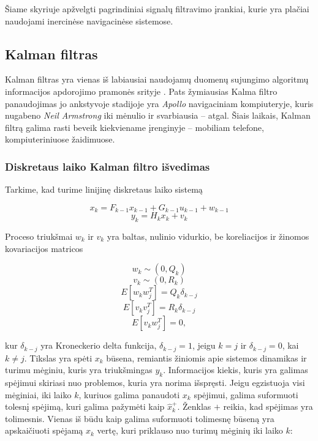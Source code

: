 Šiame skyriuje apžvelgti pagrindiniai signalų filtravimo įrankiai, kurie yra plačiai naudojami inercinėse navigacinėse sistemose.

\subsection{Kalman filtras}

    Kalman filtras \cite{kalman1960new} yra vienas iš labiausiai naudojamų duomenų sujungimo algoritmų informacijos apdorojimo pramonės srityje \cite{faragher2012understanding}. Pats žymiausias Kalma filtro panaudojimas jo ankstyvoje stadijoje yra \textit{Apollo} navigaciniam kompiuteryje, kuris nugabeno \textit{Neil Armstrong} iki mėnulio ir svarbiausia -- atgal. Šiais laikais, Kalman filtrą galima rasti beveik kiekviename įrenginyje -- mobiliam telefone, kompiuteriniuose žaidimuose.

    \subsubsection{Diskretaus laiko Kalman filtro išvedimas}

    Tarkime, kad turime linijinę diskretaus laiko sistemą

    \begin{equation}
        x_k = F_{k-1}x_{k-1} + G_{k-1}u_{k-1} + w_{k-1}
    \end{equation}
    \begin{equation}
        y_k = H_k x_k + v_k
    \end{equation}

    Proceso triukšmai ${w_k}$ ir ${v_k}$ yra baltas, nulinio vidurkio, be koreliacijos ir žinomos kovariacijos matricos

    \begin{equation}
    w_k \sim (0, Q_k)
    \end{equation}
    \begin{equation}
    v_k \sim (0, R_k)
    \end{equation}
    \begin{equation}
    E[w_k w_j^T] = Q_k \delta_{k-j}
    \end{equation}
    \begin{equation}
    E[v_k v_j^T] = R_k\delta_{k-j}
    \end{equation}
    \begin{equation}
    E[v_k w_j^T] = 0,
    \end{equation}

    kur $\delta_{k-j}$ yra Kroneckerio delta funkcija, $\delta_{k-j} = 1$, jeigu $k=j$ ir $\delta_{k-j} = 0$, kai $k \neq j$.
    Tikslas yra spėti $x_k$ būsena, remiantis žiniomis apie sistemos dinamikas ir turimu mėginiu, kuris yra triukšmingas ${y_k}$.
    Informacijos kiekis, kuris yra galimas spėjimui skiriasi nuo problemos, kuria yra norima išspręsti.
    Jeigu egzistuoja visi mėginiai, iki laiko $k$, kuriuos galima panaudoti $x_k$ spėjimui, galima suformuoti tolesnį spėjimą, kuri galima pažymėti kaip $\hat{x}_k^{+}$.
    Ženklas $+$ reikia, kad spėjimas yra tolimesnis.
    Vienas iš būdu kaip galima suformuoti tolimesnę būseną yra apskaičiuoti spėjamą $x_k$ vertę, kuri priklauso nuo turimų mėginių iki laiko $k$:

